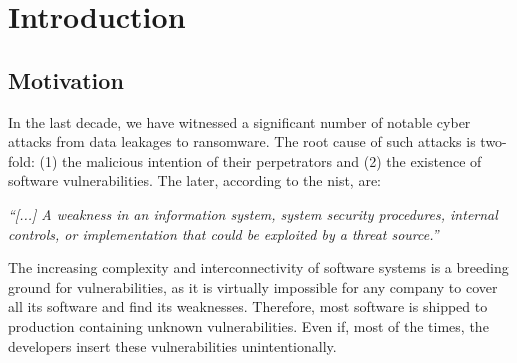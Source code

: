 \chapter{Introduction}
\label{chap:introduction}

\section{Motivation}
\label{sec:motivation}
In the last decade, we have witnessed a significant number of notable cyber attacks from data leakages to ransomware.
The root cause of such attacks is two-fold: (1) the malicious intention of their perpetrators and (2) the existence of software vulnerabilities.
The later, according to the \gls{nist}, are:

\begin{defn}
 \emph{``[...] A weakness in an information system, system security procedures, internal controls, or implementation that could be exploited by a threat source.''}~\cite{Nist:2012}
\end{defn}

The increasing complexity and interconnectivity of software systems is a breeding ground for vulnerabilities, as it is virtually impossible for any company to cover all its software and find its weaknesses.
Therefore, most software is shipped to production containing unknown vulnerabilities. 
Even if, most of the times, the developers insert these vulnerabilities unintentionally.


